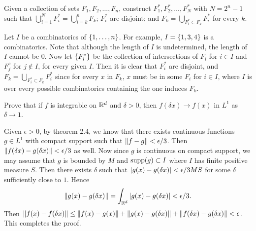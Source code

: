 \begin{exercise}
    Given a collection of sets $F_1,F_2,\ldots,F_n$, construct 
    $F_1^*,F_2^*,\ldots,F_N^*$ with $N=2^n-1$ such 
    that $\bigcup_{i=1}^{N}F_i^* = \bigcup_{i=k}^{n}F_k$; 
    $F_i^*$ are disjoint; and $F_k = 
    \bigcup_{F_i^*\subset F_k}F_i^*$ for every $k$.
\end{exercise}
\begin{pf}
    Let $I$ be a combinatorics of $\left\{ {1,\ldots,n} \right\}$. For 
    example, $I=\left\{ {1,3,4} \right\}$ is a combinatorics. Note that 
    although the length of $I$ is undetermined, the length 
    of $I$ cannot be $0$. Now let $\left\{ {F_i^*} \right\}$ be the 
    collection of intersections of $F_i$ for $i\in I$ and 
    $F_j^c$ for $j\not\in I$, for every given $I$. Then it 
    is clear that $F_i^*$ are disjoint, and $F_k = 
    \bigcup_{F_i^*\subset F_k}F_i^*$ since for every $x$ in 
    $F_k$, $x$ must be in some $F_i$ for $i\in I$, where $I$ 
    is over every possible combinatorics containing the one 
    induces $F_k$. 
\end{pf}

\begin{exercise}
    Prove that if $f$ is integrable on $\mathbb{R}^d$ and $\delta>0$, 
    then $f(\delta x)\to f(x)$ in $L^1$ as $\delta\to 1$.
\end{exercise}
\begin{pf}
    Given $\epsilon>0$, by theorem 2.4, we know that there exists 
    continuous functions $g\in L^1$ with compact support such that 
    $\left\lVert {f-g} \right\rVert<\epsilon/3$. Then $\left\lVert {f(\delta x)-g(\delta x)} \right\rVert<\epsilon/3$ 
    as well. Now since $g$ is continuous on compact support, we may assume that 
    $g$ is bounded by $M$ and $\supp{g}\subset I$ where $I$ has finite positive 
    measure $S$. Then there exists $\delta$ such that $\left\lvert {g(x)-g(\delta x)} \right\rvert
    <\epsilon/3MS$ for some $\delta$ sufficiently close to $1$. Hence 
    \begin{equation*}
        \left\lVert {g(x)-g(\delta x)} \right\rVert = \int_{\mathbb{R}^d} \left\lvert {g(x)-g(\delta x)} \right\rvert < \epsilon/3.
    \end{equation*}
    Then $\left\lVert {f(x)-f(\delta x)} \right\rVert \leq \left\lVert {f(x)-g(x)} \right\rVert + \left\lVert {g(x)-g(\delta x)} \right\rVert 
    + \left\lVert {f(\delta x)-g(\delta x)} \right\rVert < \epsilon$. This completes the proof.
\end{pf}

